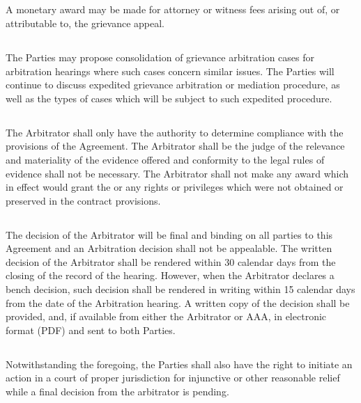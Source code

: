 {        \subsection{}
        A monetary award may be made for attorney or witness fees arising out of, or attributable to, the grievance appeal.
        \subsection{}
        The Parties may propose consolidation of grievance arbitration cases for arbitration hearings where such cases concern similar issues. The Parties will continue to discuss expedited grievance arbitration or mediation procedure, as well as the types of cases which will be subject to such expedited procedure.
        \subsection{}
        The Arbitrator shall only have the authority to determine compliance with the provisions of the Agreement. The Arbitrator shall be the judge of the relevance and materiality of the evidence offered and conformity to the legal rules of evidence shall not be necessary. The Arbitrator shall not make any award which in effect would grant the \clientbusinessname or \companyname any rights or privileges which were not obtained or preserved in the contract provisions.
        \subsection{}
        The decision of the Arbitrator will be final and binding on all parties to this Agreement and an Arbitration decision shall not be appealable. The written decision of the Arbitrator shall be rendered within 30 calendar days from the closing of the record of the hearing. However, when the Arbitrator declares a bench decision, such decision shall be rendered in writing within 15 calendar days from the date of the Arbitration hearing. A written copy of the decision shall be provided, and, if available from either the Arbitrator or AAA, in electronic format (PDF) and sent to both Parties.
        \subsection{}
        Notwithstanding the foregoing, the Parties shall also have the right to initiate an action in a court of proper jurisdiction for injunctive or other reasonable relief while a final decision from the arbitrator is pending.
}

